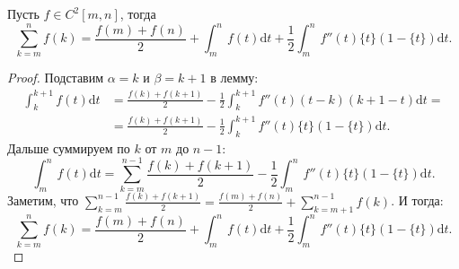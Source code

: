 \begin{theorem}
    Пусть $f \in C^2[m, n]$, тогда
     \[
         \sum_{k=m}^n f(k) = \frac{f(m) + f(n)}{2} + \int_m^n f(t) \mathrm{d}t + \frac{1}{2} \int_m^n f''(t)\{t\}(1-\{t\})\mathrm{d}t
    .\]
\end{theorem}
\begin{proof}
    Подставим $\alpha = k$ и  $\beta = k + 1$ в лемму:
    \begin{align*}
        \int_{k}^{k+1} f(t) \mathrm{d}t &= \frac{f(k) + f(k + 1)}{2} - \frac{1}{2} \int_k^{k+1} f''(t)(t-k)(k+1-t) \mathrm{d}t = \\ &= \frac{f(k) + f(k + 1)}{2} - \frac{1}{2} \int_{k}^{k+1} f''(t) \{t\}(1-\{t\}) \mathrm{d}t
        .\end{align*} Дальше суммируем по $k$ от  $m$ до  $n-1$:  \[
    \int_m^n f(t) \mathrm{d}t = \sum_{k=m}^{n-1} \frac{f(k) + f(k + 1)}{2} - \frac{1}{2} \int_m^n f''(t)\{t\}(1-\{t\}) \mathrm{d}t
.\] Заметим, что $\sum\limits_{k=m}^{n-1} \frac{f(k) + f(k + 1)}{2} = \frac{f(m) + f(n)}{2} + \sum_{k=m+1}^{n-1} f(k)$. И тогда: 
\[
    \sum_{k=m}^n f(k) = \frac{f(m) + f(n)}{2} + \int_m^n f(t)\mathrm{d}t + \frac{1}{2} \int_m^n f''(t)\{t\}(1-\{t\})\mathrm{d}t
.\] 
\end{proof}
